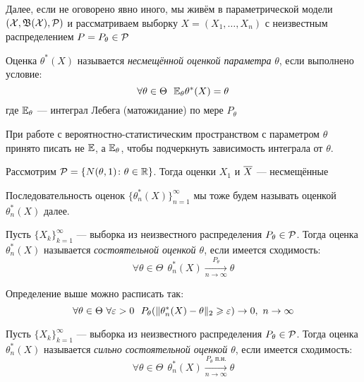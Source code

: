 \begin{note}
	Далее, если не оговорено явно иного, мы живём в параметрической модели $(\mathcal{X}, \mathfrak{B}(\mathcal{X}), \mathcal{P})$ и рассматриваем выборку $X = (X_1, \ldots, X_n)$ с неизвестным распределением $P = P_\theta \in \mathcal{P}$
\end{note}

\begin{definition}
	Оценка $\theta^*(X)$ называется \textit{несмещённой оценкой параметра} $\theta$, если выполнено условие:
	\[
		\forall \theta \in \Theta\ \ \mathbb{E}_\theta \theta^*(X) = \theta
	\]
	где $\mathbb{E}_\theta$ --- интеграл Лебега (матожидание) по мере $P_\theta$
\end{definition}

\begin{anote}
	При работе с вероятностно-статистическим пространством с параметром $\theta$ принято писать не $\mathbb{E}$, а $\mathbb{E}_\theta$, чтобы подчеркнуть зависимость интеграла от $\theta$.
\end{anote}

\begin{example}
	Рассмотрим $\mathcal{P} = \{N(\theta, 1) \colon \theta \in \mathbb{R}\}$. Тогда оценки $X_1$ и $\overline{X}$ --- несмещённые
\end{example}

\begin{anote}
	Последовательность оценок $\{\theta_n^*(X)\}_{n = 1}^\infty$ мы тоже будем называть оценкой $\theta_n^*(X)$ далее.
\end{anote}

\begin{definition}
	Пусть $\{X_k\}_{k = 1}^\infty$ --- выборка из неизвестного распределения $P_\theta \in \mathcal{P}$. Тогда оценка $\theta_n^*(X)$ называется \textit{состоятельной оценкой $\theta$}, если имеется сходимость:
	\[
		\forall \theta \in \Theta\ \ \theta_n^*(X) \xrightarrow[n \to \infty]{P_\theta} \theta
	\]
\end{definition}

\begin{note}
	Определение выше можно расписать так:
	\[
		\forall \theta \in \Theta\ \forall \eps > 0\ \ P_\theta(\|\theta_n^*(X) - \theta\|_2 \ge \eps) \to 0,\ n \to \infty
	\]
\end{note}

\begin{definition}
	Пусть $\{X_k\}_{k = 1}^\infty$ --- выборка из неизвестного распределения $P_\theta \in \mathcal{P}$. Тогда оценка $\theta_n^*(X)$ называется \textit{сильно состоятельной оценкой $\theta$}, если имеется сходимость:
	\[
		\forall \theta \in \Theta\ \ \theta_n^*(X) \xrightarrow[n \to \infty]{P_\theta\text{ п.н.}} \theta
	\]
\end{definition}

